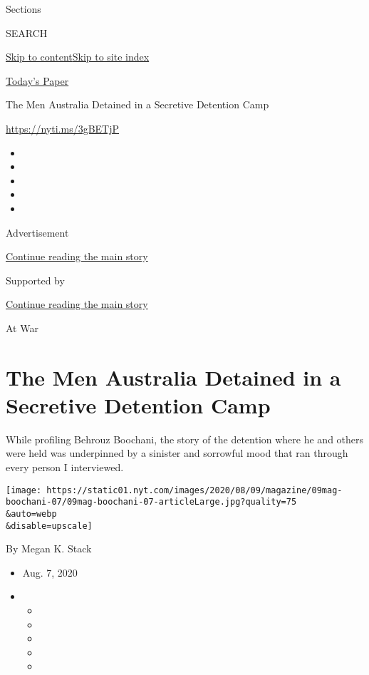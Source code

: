 Sections

SEARCH

\protect\hyperlink{site-content}{Skip to
content}\protect\hyperlink{site-index}{Skip to site index}

\href{https://myaccount.nytimes.com/auth/login?response_type=cookie\&client_id=vi}{}

\href{https://www.nytimes.com/section/todayspaper}{Today's Paper}

The Men Australia Detained in a Secretive Detention Camp

\href{https://nyti.ms/3gBETjP}{https://nyti.ms/3gBETjP}

\begin{itemize}
\item
\item
\item
\item
\item
\end{itemize}

Advertisement

\protect\hyperlink{after-top}{Continue reading the main story}

Supported by

\protect\hyperlink{after-sponsor}{Continue reading the main story}

At War

\hypertarget{the-men-australia-detained-in-a-secretive-detention-camp}{%
\section{The Men Australia Detained in a Secretive Detention
Camp}\label{the-men-australia-detained-in-a-secretive-detention-camp}}

While profiling Behrouz Boochani, the story of the detention where he
and others were held was underpinned by a sinister and sorrowful mood
that ran through every person I interviewed.

\texttt{[image: https://static01.nyt.com/images/2020/08/09/magazine/09mag-boochani-07/09mag-boochani-07-articleLarge.jpg?quality=75\\\&auto=webp\\\&disable=upscale]}

By Megan K. Stack

\begin{itemize}
\item
  Aug. 7, 2020
\item
  \begin{itemize}
  \item
  \item
  \item
  \item
  \item
  \end{itemize}
\end{itemize}

